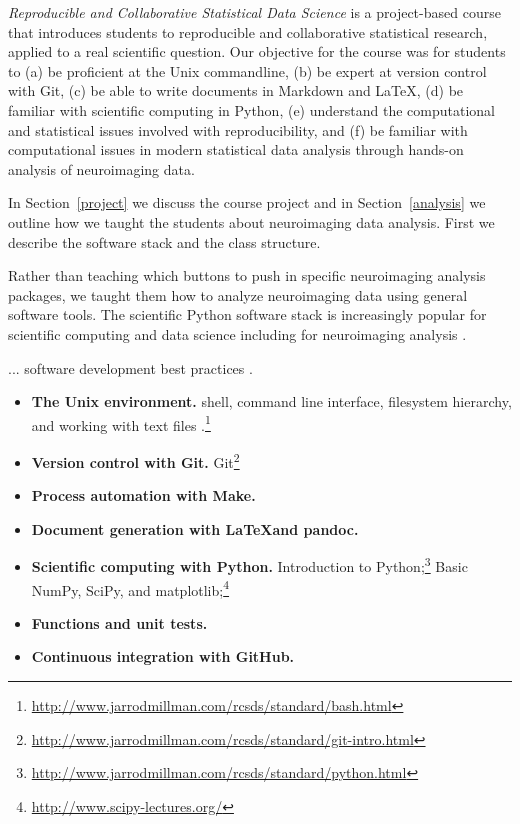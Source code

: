 \emph{Reproducible and Collaborative Statistical Data Science} is a
project-based course that introduces students to reproducible and collaborative
statistical research, applied to a real scientific question.
Our objective for the course was for students to
(a) be proficient at the Unix commandline,
(b) be expert at version control with Git,
(c) be able to write documents in Markdown and \LaTeX,
(d) be familiar with scientific computing in Python,
(e) understand the computational and statistical issues involved with reproducibility, and
(f) be familiar with computational issues in modern statistical data
analysis through hands-on analysis of neuroimaging data.

In Section~\ref{project} we discuss the course project and
in Section~\ref{analysis} we outline how we taught the
students about neuroimaging data analysis.
First we describe the software stack and the class structure.

Rather than teaching which buttons to push in specific neuroimaging analysis
packages, we taught them how to analyze neuroimaging data using general
software tools.
The scientific Python software stack \citep{millman2011python, perez2011python}
is increasingly popular for scientific computing and data science
including for neuroimaging analysis \citep{millman2007analysis}.

... software development best practices \citep{millman2014developing}.

\begin{itemize}
\item \textbf{The Unix environment.}
shell, command line interface, filesystem hierarchy, and
working with text files
\citep{preeyanon2014reproducible}.\footnote{\url{http://www.jarrodmillman.com/rcsds/standard/bash.html}}

\item \textbf{Version control with Git.}
Git\footnote{\url{http://www.jarrodmillman.com/rcsds/standard/git-intro.html}}

\item \textbf{Process automation with Make.}

\item \textbf{Document generation with \LaTeX and pandoc.}

\item \textbf{Scientific computing with Python.}
Introduction to Python;\footnote{\url{http://www.jarrodmillman.com/rcsds/standard/python.html}}
Basic NumPy, SciPy, and matplotlib;\footnote{\url{http://www.scipy-lectures.org/}}

\item \textbf{Functions and unit tests.}

\item \textbf{Continuous integration with GitHub.}

\end{itemize}


